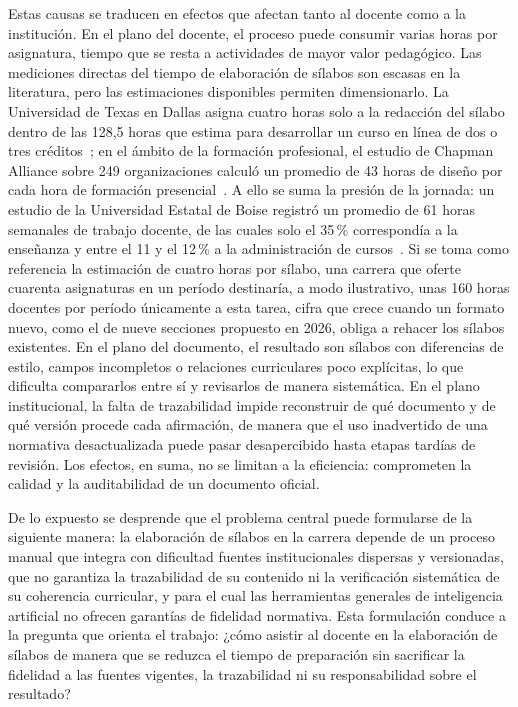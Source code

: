 Estas causas se traducen en efectos que afectan tanto al docente como a la institución. En el plano del docente, el proceso puede consumir varias horas por asignatura, tiempo que se resta a actividades de mayor valor pedagógico. Las mediciones directas del tiempo de elaboración de sílabos son escasas en la literatura, pero las estimaciones disponibles permiten dimensionarlo. La Universidad de Texas en Dallas asigna cuatro horas solo a la redacción del sílabo dentro de las 128,5 horas que estima para desarrollar un curso en línea de dos o tres créditos~\cite{utd2019faq}; en el ámbito de la formación profesional, el estudio de Chapman Alliance sobre 249 organizaciones calculó un promedio de 43 horas de diseño por cada hora de formación presencial~\cite{chapman2010}. A ello se suma la presión de la jornada: un estudio de la Universidad Estatal de Boise registró un promedio de 61 horas semanales de trabajo docente, de las cuales solo el 35\,\% correspondía a la enseñanza y entre el 11 y el 12\,\% a la administración de cursos~\cite{flaherty2014}. Si se toma como referencia la estimación de cuatro horas por sílabo, una carrera que oferte cuarenta asignaturas en un período destinaría, a modo ilustrativo, unas 160 horas docentes por período únicamente a esta tarea, cifra que crece cuando un formato nuevo, como el de nueve secciones propuesto en 2026, obliga a rehacer los sílabos existentes. En el plano del documento, el resultado son sílabos con diferencias de estilo, campos incompletos o relaciones curriculares poco explícitas, lo que dificulta compararlos entre sí y revisarlos de manera sistemática. En el plano institucional, la falta de trazabilidad impide reconstruir de qué documento y de qué versión procede cada afirmación, de manera que el uso inadvertido de una normativa desactualizada puede pasar desapercibido hasta etapas tardías de revisión. Los efectos, en suma, no se limitan a la eficiencia: comprometen la calidad y la auditabilidad de un documento oficial.

De lo expuesto se desprende que el problema central puede formularse de la siguiente manera: la elaboración de sílabos en la carrera depende de un proceso manual que integra con dificultad fuentes institucionales dispersas y versionadas, que no garantiza la trazabilidad de su contenido ni la verificación sistemática de su coherencia curricular, y para el cual las herramientas generales de inteligencia artificial no ofrecen garantías de fidelidad normativa. Esta formulación conduce a la pregunta que orienta el trabajo: ¿cómo asistir al docente en la elaboración de sílabos de manera que se reduzca el tiempo de preparación sin sacrificar la fidelidad a las fuentes vigentes, la trazabilidad ni su responsabilidad sobre el resultado?


